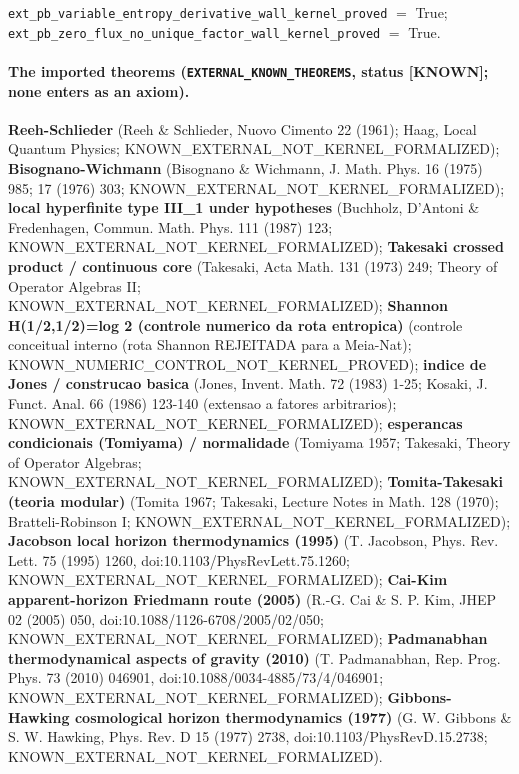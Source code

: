 \documentclass[11pt]{article}
\theoremstyle{definition}\newtheorem{deriv}{Derivation}
\begin{document}
\texttt{ext\_pb\_variable\_entropy\_derivative\_wall\_kernel\_proved} $=$ True; \texttt{ext\_pb\_zero\_flux\_no\_unique\_factor\_wall\_kernel\_proved} $=$ True.

\paragraph*{The imported theorems (\texttt{EXTERNAL\_KNOWN\_THEOREMS}, status [KNOWN]; none enters as an axiom).} \textbf{Reeh-Schlieder} (Reeh \& Schlieder, Nuovo Cimento 22 (1961); Haag, Local Quantum Physics; KNOWN\_EXTERNAL\_NOT\_KERNEL\_FORMALIZED); \textbf{Bisognano-Wichmann} (Bisognano \& Wichmann, J. Math. Phys. 16 (1975) 985; 17 (1976) 303; KNOWN\_EXTERNAL\_NOT\_KERNEL\_FORMALIZED); \textbf{local hyperfinite type III\_1 under hypotheses} (Buchholz, D'Antoni \& Fredenhagen, Commun. Math. Phys. 111 (1987) 123; KNOWN\_EXTERNAL\_NOT\_KERNEL\_FORMALIZED); \textbf{Takesaki crossed product / continuous core} (Takesaki, Acta Math. 131 (1973) 249; Theory of Operator Algebras II; KNOWN\_EXTERNAL\_NOT\_KERNEL\_FORMALIZED); \textbf{Shannon H(1/2,1/2)=log 2 (controle numerico da rota entropica)} (controle conceitual interno (rota Shannon REJEITADA para a Meia-Nat); KNOWN\_NUMERIC\_CONTROL\_NOT\_KERNEL\_PROVED); \textbf{indice de Jones / construcao basica} (Jones, Invent. Math. 72 (1983) 1-25; Kosaki, J. Funct. Anal. 66 (1986) 123-140 (extensao a fatores arbitrarios); KNOWN\_EXTERNAL\_NOT\_KERNEL\_FORMALIZED); \textbf{esperancas condicionais (Tomiyama) / normalidade} (Tomiyama 1957; Takesaki, Theory of Operator Algebras; KNOWN\_EXTERNAL\_NOT\_KERNEL\_FORMALIZED); \textbf{Tomita-Takesaki (teoria modular)} (Tomita 1967; Takesaki, Lecture Notes in Math. 128 (1970); Bratteli-Robinson I; KNOWN\_EXTERNAL\_NOT\_KERNEL\_FORMALIZED); \textbf{Jacobson local horizon thermodynamics (1995)} (T. Jacobson, Phys. Rev. Lett. 75 (1995) 1260, doi:10.1103/PhysRevLett.75.1260; KNOWN\_EXTERNAL\_NOT\_KERNEL\_FORMALIZED); \textbf{Cai-Kim apparent-horizon Friedmann route (2005)} (R.-G. Cai \& S. P. Kim, JHEP 02 (2005) 050, doi:10.1088/1126-6708/2005/02/050; KNOWN\_EXTERNAL\_NOT\_KERNEL\_FORMALIZED); \textbf{Padmanabhan thermodynamical aspects of gravity (2010)} (T. Padmanabhan, Rep. Prog. Phys. 73 (2010) 046901, doi:10.1088/0034-4885/73/4/046901; KNOWN\_EXTERNAL\_NOT\_KERNEL\_FORMALIZED); \textbf{Gibbons-Hawking cosmological horizon thermodynamics (1977)} (G. W. Gibbons \& S. W. Hawking, Phys. Rev. D 15 (1977) 2738, doi:10.1103/PhysRevD.15.2738; KNOWN\_EXTERNAL\_NOT\_KERNEL\_FORMALIZED).
\end{document}
